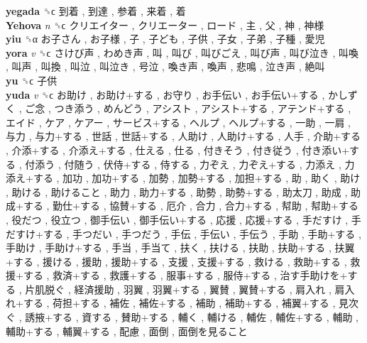 \textbf{yegada} ␝ϲ   到着 ,  到達 ,  参着 ,  来着 ,  着   \\
\textbf{Yehova} \emph{n}  ␝ϲ   クリエイター ,  クリエーター ,  ロード ,  主 ,  父 ,  神 ,  神様   \\
\textbf{yiu} ␝α   お子さん ,  お子様 ,  子 ,  子ども ,  子供 ,  子女 ,  子弟 ,  子種 ,  愛児   \\
\textbf{yora} \emph{v}  ␝ϲ   さけび声 ,  わめき声 ,  叫 ,  叫び ,  叫びごえ ,  叫び声 ,  叫び泣き ,  叫喚 ,  叫声 ,  叫換 ,  叫泣 ,  叫泣き ,  号泣 ,  喚き声 ,  喚声 ,  悲鳴 ,  泣き声 ,  絶叫   \\
\textbf{yu} ␝ϲ   子供   \\
\textbf{yuda} \emph{v}  ␝ϲ   お助け ,  お助け+する ,  お守り ,  お手伝い ,  お手伝い+する ,  かしずく ,  ご念 ,  つき添う ,  めんどう ,  アシスト ,  アシスト+する ,  アテンド+する ,  エイド ,  ケア ,  ケアー ,  サービス+する ,  ヘルプ ,  ヘルプ+する ,  一助 ,  一肩 ,  与力 ,  与力+する ,  世話 ,  世話+する ,  人助け ,  人助け+する ,  人手 ,  介助+する ,  介添+する ,  介添え+する ,  仕える ,  仕る ,  付きそう ,  付き従う ,  付き添い+する ,  付添う ,  付随う ,  伏侍+する ,  侍する ,  力ぞえ ,  力ぞえ+する ,  力添え ,  力添え+する ,  加功 ,  加功+する ,  加勢 ,  加勢+する ,  加担+する ,  助 ,  助く ,  助け ,  助ける ,  助けること ,  助力 ,  助力+する ,  助勢 ,  助勢+する ,  助太刀 ,  助成 ,  助成+する ,  勤仕+する ,  協賛+する ,  厄介 ,  合力 ,  合力+する ,  幇助 ,  幇助+する ,  役だつ ,  役立つ ,  御手伝い ,  御手伝い+する ,  応援 ,  応援+する ,  手だすけ ,  手だすけ+する ,  手つだい ,  手つだう ,  手伝 ,  手伝い ,  手伝う ,  手助 ,  手助+する ,  手助け ,  手助け+する ,  手当 ,  手当て ,  扶く ,  扶ける ,  扶助 ,  扶助+する ,  扶翼+する ,  援ける ,  援助 ,  援助+する ,  支援 ,  支援+する ,  救ける ,  救助+する ,  救援+する ,  救済+する ,  救護+する ,  服事+する ,  服侍+する ,  治す手助けを+する ,  片肌脱ぐ ,  経済援助 ,  羽翼 ,  羽翼+する ,  翼賛 ,  翼賛+する ,  肩入れ ,  肩入れ+する ,  荷担+する ,  補佐 ,  補佐+する ,  補助 ,  補助+する ,  補翼+する ,  見次ぐ ,  誘掖+する ,  資する ,  賛助+する ,  輔く ,  輔ける ,  輔佐 ,  輔佐+する ,  輔助 ,  輔助+する ,  輔翼+する ,  配慮 ,  面倒 ,  面倒を見ること   \\
